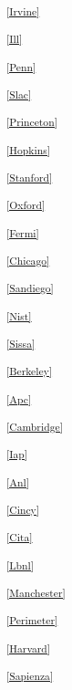 \clearpage

\begin{multicols}{2}

\scriptsize

\parskip=4pt

\noindent
\textsuperscript{\ref{Irvine}}\Irvinetext

\noindent
\textsuperscript{\ref{Ill}}\Illtext

\noindent
\textsuperscript{\ref{Penn}}\Penntext

\noindent
\textsuperscript{\ref{Slac}}\Slactext

\noindent
\textsuperscript{\ref{Princeton}}\Princetontext

\noindent
\textsuperscript{\ref{Hopkins}}\Hopkinstext

\noindent
\textsuperscript{\ref{Stanford}}\Stanfordtext

\noindent
\textsuperscript{\ref{Oxford}}\Oxfordtext

\noindent
\textsuperscript{\ref{Fermi}}\Fermitext

\noindent
\textsuperscript{\ref{Chicago}}\Chicagotext

\noindent
\textsuperscript{\ref{Sandiego}}\Sandiegotext

\noindent
\textsuperscript{\ref{Nist}}\Nisttext

\noindent
\textsuperscript{\ref{Sissa}}\Sissatext

\noindent
\textsuperscript{\ref{Berkeley}}\Berkeleytext

\noindent
\textsuperscript{\ref{Apc}}\Apctext

\noindent
\textsuperscript{\ref{Cambridge}}\Cambridgetext

\noindent
\textsuperscript{\ref{Iap}}\Iaptext

\noindent
\textsuperscript{\ref{Anl}}\Anltext

\noindent
\textsuperscript{\ref{Cincy}}\Cincytext

\noindent
\textsuperscript{\ref{Cita}}\Citatext

\noindent
\textsuperscript{\ref{Lbnl}}\Lbnltext

\noindent
\textsuperscript{\ref{Manchester}}\Manchestertext

\noindent
\textsuperscript{\ref{Perimeter}}\Perimetertext

\noindent
\textsuperscript{\ref{Harvard}}\Harvardtext

\noindent
\textsuperscript{\ref{Sapienza}}\Sapienzatext


\end{multicols}

